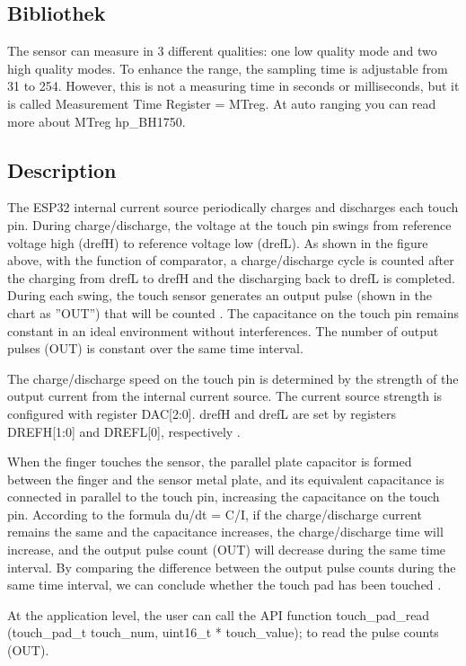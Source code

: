 \subsection{Bibliothek}

The sensor can measure in 3 different qualities: one low quality mode and two high quality modes.
To enhance the range, the sampling time is adjustable from 31 to 254.
However, this is not a measuring time in seconds or milliseconds, but it is called Measurement Time Register = MTreg. At auto ranging you can read more about \cite{Vogelgesang:2024} MTreg hp_BH1750.

\subsection{Description}
The ESP32 internal current source periodically charges and discharges each touch pin. During charge/discharge, the voltage at the touch pin swings from reference voltage high (drefH) to reference voltage low (drefL). As shown in the figure above, with the function of comparator, a charge/discharge cycle is counted after the charging from drefL to drefH and the discharging back to drefL is completed. During each swing, the touch sensor generates an output pulse (shown in the chart as ”OUT”) that will be counted \cite{Amin:2021}. The capacitance on the touch pin remains constant in an ideal environment without interferences. The number of output pulses (OUT) is constant over the same time interval.

The charge/discharge speed on the touch pin is determined by the strength of the output current from the internal current source. The current source strength is configured with register DAC[2:0]. drefH and drefL are set by registers DREFH[1:0] and DREFL[0], respectively \cite{Azzam:2021}.

When the finger touches the sensor, the parallel plate capacitor is formed between the finger and the sensor metal plate, and its equivalent capacitance is connected in parallel to the touch pin, increasing the capacitance on the touch pin. According to the formula du/dt = C/I, if the charge/discharge current remains the same and the capacitance increases, the charge/discharge time will increase, and the output pulse count (OUT) will decrease during the same time interval. By comparing the difference between the output pulse counts during the same time interval, we can conclude whether the touch pad has been touched \cite{Arif:2023}.

At the application level, the user can call the API function touch_pad_read (touch_pad_t touch_num, uint16_t * touch_value); to read the pulse counts (OUT).

